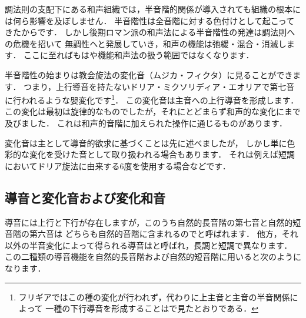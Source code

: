\documentclass[dvipdfmx,uplatex,b5paper,openany,jbase=12Q,nomag*,textwidth-limit=44%
               ]{gachimuchi}[2020/05/05]
\begin{document}
\begin{Yodan}
調法則の支配下にある和声組織では，半音階的関係が導入されても組織の根本には何ら影響を及ぼしません．
半音階性は全音階に対する色付けとして起こってきたからです．
しかし後期ロマン派の和声法による半音階性の発達は調法則への危機を招いて
無調性へと発展していき，和声の機能は弛緩・混合・消滅します．
ここに至ればもはや機能和声法の扱う範囲ではなくなります．

半音階性の始まりは教会旋法の変化音（ムジカ・フィクタ）に見ることができます．
つまり，上行導音を持たないドリア・ミクソリディア・エオリアで第七音に行われるような嬰変化です\footnote{%
  フリギアではこの種の変化が行われず，代わりに上主音と主音の半音関係によって
  一種の下行導音を形成することはで見たとおりである．
}．
この変化音は主音への上行導音を形成します．
この変化は最初は旋律的なものでしたが，それにとどまらず和声的な変化にまで及びました．
これは和声的音階に加えられた操作に通じるものがあります．

変化音は主として導音的欲求に基づくことは先に述べましたが，
しかし単に色彩的な変化を受けた音として取り扱われる場合もあります．
それは例えば短調においてドリア旋法に由来する\bNatural6度を使用する場合などです．
\end{Yodan}

\subsection{導音と変化音および変化和音}
導音には上行と下行が存在しますが，このうち自然的長音階の第七音と自然的短音階の第六音は
どちらも自然的音階に含まれるのでと呼ばれます．
他方，それ以外の半音変化によって得られる導音はと呼ばれ，長調と短調で異なります．
この二種類の導音機能を自然的長音階および自然的短音階に用いると次のようになります．
\end{document}
